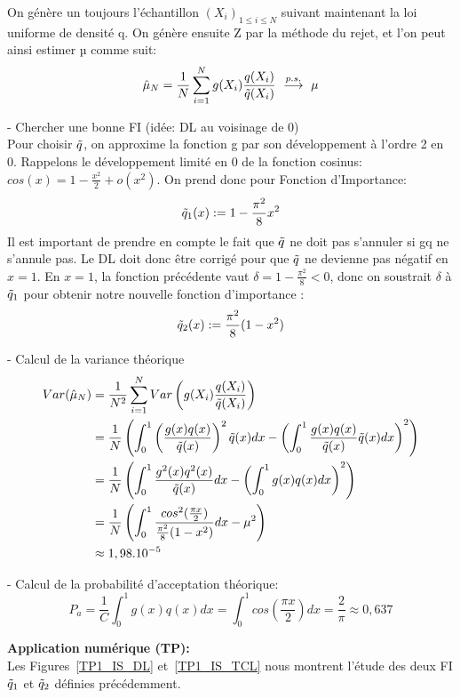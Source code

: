 \documentclass{article}
\begin{document}
On génère un toujours l'échantillon $(X_i)_{1\leq i \leq N}$ suivant maintenant la loi uniforme de densité q. On génère ensuite Z par la méthode du rejet, et l'on peut ainsi estimer µ comme suit: 
$$ \hat{\mu}_N = \frac1{N} \sum_{i=1}^N g(X_i)\frac{q(X_i)}{\Tilde{q}(X_i)}\ \overset{p.s.}{\longrightarrow}\ \mu $$

- Chercher une bonne FI (idée: DL au voisinage de 0)  \\
Pour choisir $\Tilde{q}$, on approxime la fonction g par son développement à l'ordre 2 en 0. Rappelons le développement limité en 0 de la fonction cosinus: 
$ cos(x) = 1 - \frac{x^2}{2} + o(x^2) $.
On prend donc pour Fonction d'Importance: 
$$\Tilde{q}_1(x):= 1 - \frac{\pi^2}{8} x^2 $$
Il est important de prendre en compte le fait que $\Tilde{q}$ ne doit pas s'annuler si gq ne s'annule pas. Le DL doit donc être corrigé pour que $\Tilde{q}$ ne devienne pas négatif en $x=1$. En $x=1$, la fonction précédente vaut $\delta = 1 - \frac{\pi^2}{8} < 0$, donc on soustrait $\delta$ à $\Tilde{q}_1$ pour obtenir notre nouvelle fonction d'importance :
$$\Tilde{q}_2(x):= \frac{\pi^2}{8}(1 - x^2) $$

- Calcul de la variance théorique
\begin{align*} 
  Var(\hat{\mu}_N) &= \frac1{N^2} \sum_{i=1}^N Var \left ( g(X_i)\frac{q(X_i)}{\Tilde{q}(X_i)}\right)\\ 
  &= \frac1{N} \left ( \int_0^1 \left (\frac{g(x)q(x)}{\Tilde{q}(x)} \right )^2 \Tilde{q}(x) dx  - \left ( \int_0^1 \frac{g(x)q(x)}{\Tilde{q}(x)} \Tilde{q}(x) dx \right )^2 \right )\\
  &= \frac1{N} \left ( \int_0^1 \frac{g^2(x)q^2(x)}{\Tilde{q}(x)} dx  - \left ( \int_0^1 g(x)q(x) dx \right )^2 \right )\\
  &= \frac1{N} \left ( \int_0^1 \frac{cos^2(\frac{\pi x}2)}{\frac{\pi^2}{8} (1 -  x^2)} dx   - \mu^2 \right )\\
  &\approx 1,98.10^{-5}\\
\end{align*}

- Calcul de la probabilité d'acceptation théorique:
$$P_a = \frac1C \int_0^1 g(x)q(x)dx 
= \int_0^1 cos(\frac{\pi x}{2})dx 
=\frac{2}{\pi} 
\approx 0,637$$

\textbf{Application numérique (TP):}\\
Les Figures~\ref{TP1_IS_DL} et~\ref{TP1_IS_TCL} nous montrent l'étude des deux FI $\Tilde{q}_1$ et $\Tilde{q}_2$ définies précédemment.
\end{document}
